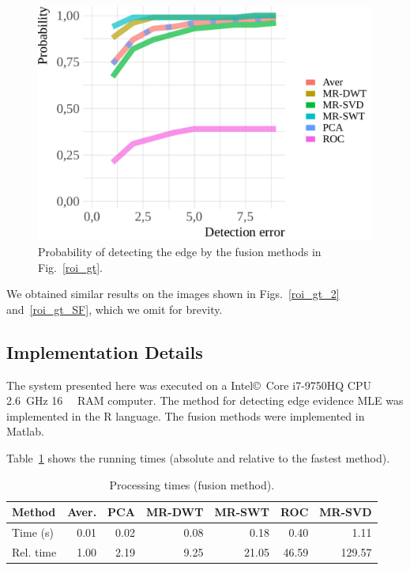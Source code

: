 \documentclass[journal]{IEEEtran}
\begin{document}
\begin{figure}[hbt]
	\centering
	\includegraphics[width=.8\linewidth]{metricas_6_fusao_flevoland}
	\caption{Probability of detecting the edge by the fusion methods in Fig.~\ref{roi_gt}.}
	\label{probability_edge_detc}
\end{figure}

We obtained similar results on the images shown in Figs.~\ref{roi_gt_2} and~\ref{roi_gt_SF}, which we omit for brevity.

\subsection{Implementation Details}

The system presented here was executed on a Intel\copyright\ Core i7-9750HQ CPU \SI{2.6}{\giga\hertz} \SI{16}{\giga\byte} RAM computer.  
The method for detecting edge evidence MLE was implemented in the R language.
The fusion methods were implemented in Matlab. 

Table~\ref{metrica_de_tempo} shows the running times (absolute and relative to the fastest method).

\begin{table}[hbt]
	\centering
	\caption{Processing times (fusion method).}\label{metrica_de_tempo}
	\begin{tabular}{@{}lrrrrrr@{}} \toprule
		Method       & Aver.   &   PCA      &  MR-DWT  & MR-SWT &  ROC  &  MR-SVD \\ \midrule
		Time (s)      & 0.01      & 0.02       &  0.08 & 0.18      &  0.40       & 1.11  \\
		Rel. time     & 1.00      & 2.19       &  9.25 & 21.05     &  46.59      & 129.57  \\ \bottomrule
	\end{tabular}
\end{table}
\end{document}
